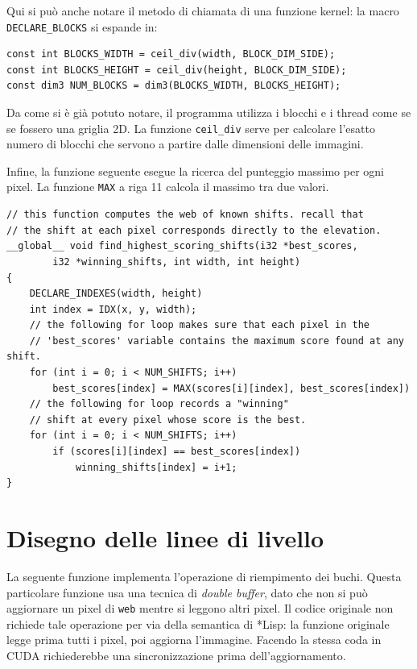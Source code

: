 \documentclass[12pt,a4paper,openright,twoside]{report}
\begin{document}
Qui si può anche notare il metodo di chiamata di una funzione kernel: la macro \verb|DECLARE_BLOCKS| si espande in:

\begin{lstlisting}[style=mystyle]
const int BLOCKS_WIDTH = ceil_div(width, BLOCK_DIM_SIDE);
const int BLOCKS_HEIGHT = ceil_div(height, BLOCK_DIM_SIDE);
const dim3 NUM_BLOCKS = dim3(BLOCKS_WIDTH, BLOCKS_HEIGHT);
\end{lstlisting}

Da come si è già potuto notare, il programma utilizza i blocchi e i thread come se se fossero una griglia 2D. La funzione \verb|ceil_div| serve per calcolare l'esatto numero di blocchi che servono a partire dalle dimensioni delle immagini.


Infine, la funzione seguente esegue la ricerca del punteggio massimo per ogni pixel. La funzione \verb|MAX| a riga 11 calcola il massimo tra due valori.

\begin{lstlisting}[style=mystyle]
// this function computes the web of known shifts. recall that
// the shift at each pixel corresponds directly to the elevation.
__global__ void find_highest_scoring_shifts(i32 *best_scores,
        i32 *winning_shifts, int width, int height)
{
    DECLARE_INDEXES(width, height)
    int index = IDX(x, y, width);
    // the following for loop makes sure that each pixel in the
    // 'best_scores' variable contains the maximum score found at any shift.
    for (int i = 0; i < NUM_SHIFTS; i++)
        best_scores[index] = MAX(scores[i][index], best_scores[index])
    // the following for loop records a "winning"
    // shift at every pixel whose score is the best.
    for (int i = 0; i < NUM_SHIFTS; i++)
        if (scores[i][index] == best_scores[index])
            winning_shifts[index] = i+1;
}
\end{lstlisting}

\section{Disegno delle linee di livello}

La seguente funzione implementa l'operazione di riempimento dei buchi. Questa particolare funzione usa una tecnica di \textit{double buffer}, dato che non si può aggiornare un pixel di \verb|web| mentre si leggono altri pixel. Il codice originale non richiede tale operazione per via della semantica di *Lisp: la funzione originale legge prima tutti i pixel, poi aggiorna l'immagine. Facendo la stessa coda in CUDA richiederebbe una sincronizzazione prima dell'aggiornamento.
\end{document}
